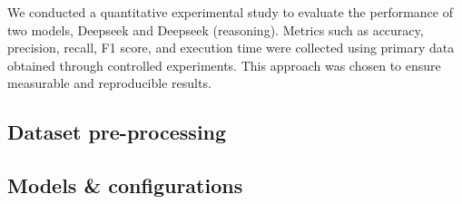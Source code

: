 We conducted a quantitative experimental study to evaluate the performance of
two models, Deepseek and Deepseek (reasoning). Metrics such as accuracy, precision,
recall, F1 score, and execution time were collected using primary data obtained
through controlled experiments. This approach was chosen to ensure measurable and
reproducible results.
%

\subsection{Dataset pre-processing}
%

\subsection{Models \& configurations}
%
%
%

